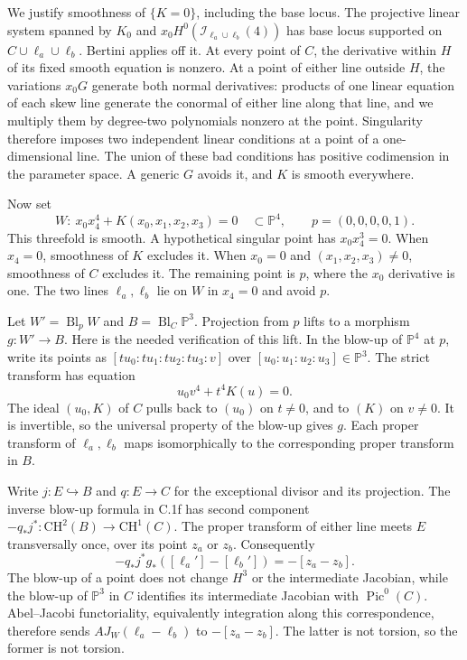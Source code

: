 We justify smoothness of $\{K=0\}$, including the base locus.
The projective linear system spanned by $K_0$ and
$x_0H^0(\mathcal I_{\ell_a\cup\ell_b}(4))$ has base locus supported on
$C\cup\ell_a\cup\ell_b$. Bertini applies off it. At every point of
$C$, the derivative within $H$ of its fixed smooth equation is
nonzero. At a point of either line outside $H$, the variations $x_0G$
generate both normal derivatives: products of one linear equation of
each skew line generate the conormal of either line along that line,
and we multiply them by degree-two polynomials nonzero at the point.
Singularity therefore imposes two independent linear conditions at
a point of a one-dimensional line. The union of these bad conditions
has positive codimension in the parameter space. A generic $G$ avoids
it, and $K$ is smooth everywhere.

Now set
\[
 W:\ x_0x_4^4+K(x_0,x_1,x_2,x_3)=0\quad\subset\mathbb P^4,
 \qquad p=(0,0,0,0,1).
\]
This threefold is smooth. A hypothetical singular point has
$x_0x_4^3=0$. When $x_4=0$, smoothness of $K$ excludes it.
When $x_0=0$ and $(x_1,x_2,x_3)\ne0$, smoothness of $C$ excludes
it. The remaining point is $p$, where the $x_0$ derivative is one.
The two lines $\ell_a,\ell_b$ lie on $W$ in $x_4=0$ and avoid $p$.

Let $W'=\operatorname{Bl}_pW$ and $B=\operatorname{Bl}_C\mathbb P^3$.
Projection from $p$ lifts to a morphism $g:W'\to B$. Here is the
needed verification of this lift. In the blow-up of $\mathbb P^4$
at $p$, write its points as $[tu_0:tu_1:tu_2:tu_3:v]$ over
$[u_0:u_1:u_2:u_3]\in\mathbb P^3$. The strict transform has equation
\[
 u_0v^4+t^4K(u)=0.
\]
The ideal $(u_0,K)$ of $C$ pulls back to $(u_0)$ on $t\ne0$, and
to $(K)$ on $v\ne0$. It is invertible, so the universal property
of the blow-up gives $g$. Each proper transform of $\ell_a,\ell_b$
maps isomorphically to the corresponding proper transform in $B$.

Write $j:E\hookrightarrow B$ and $q:E\to C$ for the exceptional
divisor and its projection. The inverse blow-up formula in C.1f
has second component $-q_*j^*:\mathrm{CH}^2(B)\to\mathrm{CH}^1(C)$.
The proper transform of either line meets $E$ transversally once,
over its point $z_a$ or $z_b$. Consequently
\[
 -q_*j^*g_*([\ell_a']-[\ell_b'])=-[z_a-z_b].
\]
The blow-up of a point does not change $H^3$ or the intermediate
Jacobian, while the blow-up of $\mathbb P^3$ in $C$ identifies its
intermediate Jacobian with $\operatorname{Pic}^0(C)$. Abel--Jacobi
functoriality, equivalently integration along this correspondence,
therefore sends $AJ_W(\ell_a-\ell_b)$ to $-[z_a-z_b]$.
The latter is not torsion, so the former is not torsion.

